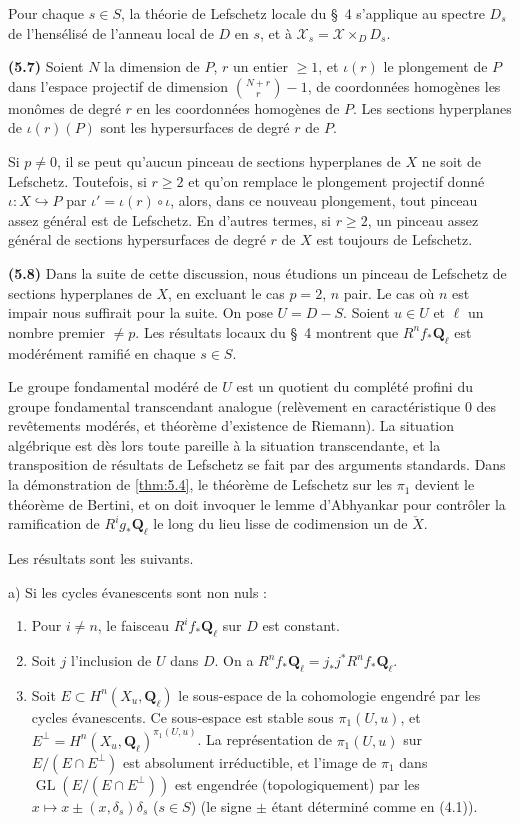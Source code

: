 \documentclass[12pt,a4paper]{amsart}
\theoremstyle{plain}
\theoremstyle{definition}
\theoremstyle{remark}
\DeclareMathOperator{\GL}{GL}
\newcommand{\Q}{\mathbf{Q}}
\numberwithin{equation}{section}
\begin{document}
Pour chaque $s\in S$, la th\'eorie de Lefschetz locale du \S\ 4 s'applique au spectre $D_s$ de l'hens\'elis\'e de l'anneau local de $D$ en $s$, et \`a $\mathcal{X}_s=\mathcal{X}\times_D D_s$.

\noindent \textbf{(5.7)} Soient $N$ la dimension de $P$, $r$ un entier $\ge 1$, et $\iota(r)$ le plongement de $P$ dans l'espace projectif de dimension $\binom{N+r}{r}-1$, de coordonn\'ees homog\`enes les mon\^omes de degr\'e $r$ en les coordonn\'ees homog\`enes de $P$. Les sections hyperplanes de $\iota(r)(P)$ sont les hypersurfaces de degr\'e $r$ de $P$.

Si $p\not=0$, il se peut qu'aucun pinceau de sections hyperplanes de $X$ ne soit de Lefschetz. Toutefois, si $r\ge 2$ et qu'on remplace le plongement projectif donn\'e $\iota:X\hookrightarrow P$ par $\iota'=\iota(r)\circ\iota$, alors, dans ce nouveau plongement, tout pinceau assez g\'en\'eral est de Lefschetz. En d'autres termes, si $r\ge 2$, un pinceau assez g\'en\'eral de sections hypersurfaces de degr\'e $r$ de $X$ est toujours de Lefschetz.

\noindent \textbf{(5.8)} Dans la suite de cette discussion, nous \'etudions un pinceau de Lefschetz de sections hyperplanes de $X$, en excluant le cas $p=2$, $n$ pair. Le cas o\`u $n$ est impair nous suffirait pour la suite. On pose $U=D-S$. Soient $u\in U$ et $\ell$ un nombre premier $\not=p$. Les r\'esultats locaux du \S\ 4 montrent que $R^n f_\ast\Q_\ell$ est mod\'er\'ement ramifi\'e en chaque $s\in S$.

Le groupe fondamental mod\'er\'e de $U$ est un quotient du compl\'et\'e profini du groupe fondamental transcendant analogue (rel\`evement en caract\'eristique $0$ des rev\^etements mod\'er\'es, et th\'eor\`eme d'existence de Riemann). La situation alg\'ebrique est d\`es lors toute pareille \`a la situation transcendante, et la transposition de r\'esultats de Lefschetz se fait par des arguments standards. Dans la d\'emonstration de \eqref{thm:5.4}, le th\'eor\`eme de Lefschetz sur les $\pi_1$ devient le th\'eor\`eme de Bertini, et on doit invoquer le lemme d'Abhyankar pour contr\^oler la ramification de $R^i g_\ast\Q_\ell$ le long du lieu lisse de codimension un de $\check{X}$.

Les r\'esultats sont les suivants.

a) Si les cycles \'evanescents sont non nuls :
\begin{enumerate}
\item[1)] Pour $i\not=n$, le faisceau $R^i f_\ast\Q_\ell$ sur $D$ est constant.
\item[2)] Soit $j$ l'inclusion de $U$ dans $D$. On a $R^n f_\ast\Q_\ell = j_\ast j^\ast R^n f_\ast\Q_\ell$.
\item[3)] Soit $E\subset H^n(X_u,\Q_\ell)$ le sous-espace de la cohomologie engendr\'e par les cycles \'evanescents. Ce sous-espace est stable sous $\pi_1(U,u)$, et $E^\perp=H^n(X_u,\Q_\ell)^{\pi_1(U,u)}$. La repr\'esentation de $\pi_1(U,u)$ sur $E/(E\cap E^\perp)$ est absolument irr\'eductible, et l'image de $\pi_1$ dans $\GL(E/(E\cap E^\perp))$ est engendr\'ee (topologiquement) par les $x\mapsto x\pm(x,\delta_s)\delta_s$ ($s\in S$) (le signe $\pm$ \'etant d\'etermin\'e comme en (4.1)).
\end{enumerate}
\end{document}
